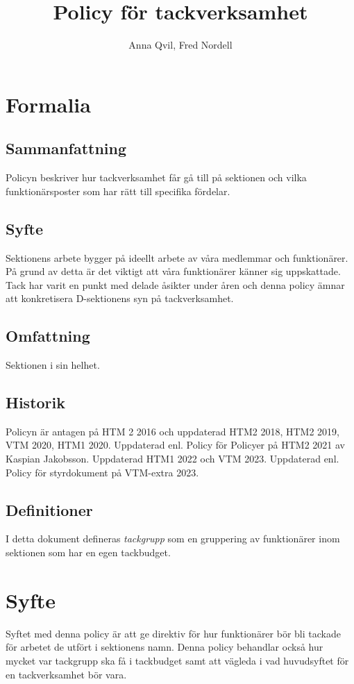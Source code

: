 \documentclass{dsekprotokoll}
\title{Policy för tackverksamhet}
\author{Anna Qvil, Fred Nordell}
\begin{document}
\maketitle
\section{Formalia}
\subsection{Sammanfattning}
Policyn beskriver hur tackverksamhet får gå till på sektionen och vilka funktionärsposter som har rätt till specifika fördelar.

\subsection{Syfte}
Sektionens arbete bygger på ideellt arbete av våra medlemmar och funktionärer. På grund av detta är det viktigt att våra funktionärer känner sig uppskattade. Tack har varit en punkt med delade åsikter under åren och denna policy ämnar att konkretisera D-sektionens syn på tackverksamhet.

\subsection{Omfattning}
Sektionen i sin helhet.

\subsection{Historik}
Policyn är antagen på HTM 2 2016 och uppdaterad HTM2 2018, HTM2 2019, VTM 2020, HTM1 2020.
Uppdaterad enl. Policy för Policyer på HTM2 2021 av Kaspian Jakobsson.
Uppdaterad HTM1 2022 och VTM 2023.
Uppdaterad enl. Policy för styrdokument på VTM-extra 2023.

\subsection{Definitioner}
I detta dokument defineras \textit{tackgrupp} som en gruppering
av funktionärer inom sektionen som har en egen tackbudget.



\section{Syfte}
Syftet med denna policy är att ge direktiv för hur funktionärer bör  bli tackade för arbetet de utfört i sektionens namn. Denna policy behandlar också hur mycket var tackgrupp ska få i tackbudget samt att vägleda i vad huvudsyftet för en tackverksamhet bör vara.
\end{document}

